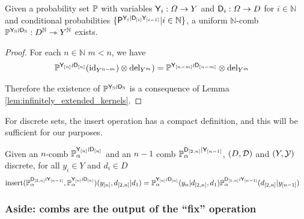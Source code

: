 \begin{theorem}
Given a probability set $\mathbb{P}$ with variables $\mathsf{Y}_i:\Omega\to Y$ and $\mathsf{D}_i:\Omega\to D$ for $i\in \mathbb{N}$ and conditional probabilities $\{\mathsf{P}^{\mathsf{Y}_i|\mathsf{D}_{[i]}\mathsf{Y}_{[i-1]}}|i\in \mathbb{N}\}$, a uniform $\mathbb{N}$-comb $\mathbb{P}^{\mathsf{Y}_{\mathbb{N}}\wr \mathsf{D}_{\mathbb{N}}}:D^\mathbb{N}\rightarrowtriangle Y^\mathbb{N}$ exists.
\end{theorem}

\begin{proof}
For each $n\in \mathbb{N}$ $m<n$, we have
\begin{align}
    \mathbb{P}^{\mathsf{Y}_{[n]}\wr \mathsf{D}_{[n]}}(\mathrm{id}_{Y^{n-m}})\otimes \mathrm{del}_{Y^m}) &= \mathbb{P}^{\mathsf{Y}_{[n-m]}\wr \mathsf{D}_{[n-m]}}\otimes \mathrm{del}_{Y^m}
\end{align}

Therefore the existence of $\mathbb{P}^{\mathsf{Y}_{\mathbb{N}}\wr \mathsf{D}_{\mathbb{N}}}$ is a consequence of Lemma \ref{lem:infinitely_extended_kernels}.
\end{proof}

For discrete sets, the insert operation has a compact definition, and this will be sufficient for our purposes.

\begin{definition}\label{def:insert_discrete}
Given an $n$-comb $\mathbb{P}_\alpha^{\mathsf{Y}_{[n]}\wr \mathsf{D}_{[n]}}$ and an $n-1$ comb $\mathbb{P}_\alpha^{\mathsf{D}_{[2,n]}|\mathsf{Y}_{[n-1]}}$, $(D,\mathcal{D})$ and $(Y,\mathcal{Y})$ discrete, for all $y_i\in Y$ and $d_i\in D$
\begin{align}
    \mathrm{insert}(\mathbb{P}_\alpha^{\mathsf{D}_{[2,n]}\wr \mathsf{Y}_{[n-1]}},\mathbb{P}_\alpha^{\mathsf{Y}_{[n]}\wr \mathsf{D}_{[n]}})(y_{[n]},d_{[2,n]}|d_1) &= \mathbb{P}_\alpha^{\mathsf{Y}_{[n]}\wr \mathsf{D}_{[n]}}(y_n|d_{[2,n]},d_1)\mathbb{P}_\alpha^{\mathsf{D}_{[1,n]}\wr\mathsf{Y}_{[n-1]}}(d_{[2,n]}|y_{[n-1]})
\end{align}
\end{definition}

\subsubsection{Aside: combs are the output of the ``fix'' operation}

